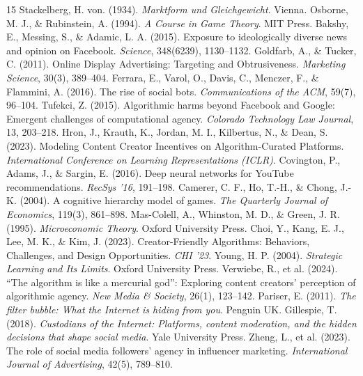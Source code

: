 \documentclass[12pt,letterpaper]{article}
\begin{document}
\begin{thebibliography}{15}
	 Stackelberg, H. von. (1934). \textit{Marktform und Gleichgewicht}. Vienna.
	 Osborne, M. J., \& Rubinstein, A. (1994). \textit{A Course in Game Theory}. MIT Press.
	 Bakshy, E., Messing, S., \& Adamic, L. A. (2015). Exposure to ideologically diverse news and opinion on Facebook. \textit{Science}, 348(6239), 1130--1132.
	 Goldfarb, A., \& Tucker, C. (2011). Online Display Advertising: Targeting and Obtrusiveness. \textit{Marketing Science}, 30(3), 389--404.
	 Ferrara, E., Varol, O., Davis, C., Menczer, F., \& Flammini, A. (2016). The rise of social bots. \textit{Communications of the ACM}, 59(7), 96--104.
	 Tufekci, Z. (2015). Algorithmic harms beyond Facebook and Google: Emergent challenges of computational agency. \textit{Colorado Technology Law Journal}, 13, 203--218.
	 Hron, J., Krauth, K., Jordan, M. I., Kilbertus, N., \& Dean, S. (2023). Modeling Content Creator Incentives on Algorithm-Curated Platforms. \textit{International Conference on Learning Representations (ICLR)}.
	 Covington, P., Adams, J., \& Sargin, E. (2016). Deep neural networks for YouTube recommendations. \textit{RecSys '16}, 191--198.
	 Camerer, C. F., Ho, T.-H., \& Chong, J.-K. (2004). A cognitive hierarchy model of games. \textit{The Quarterly Journal of Economics}, 119(3), 861--898.
	 Mas-Colell, A., Whinston, M. D., \& Green, J. R. (1995). \textit{Microeconomic Theory}. Oxford University Press.
	 Choi, Y., Kang, E. J., Lee, M. K., \& Kim, J. (2023). Creator-Friendly Algorithms: Behaviors, Challenges, and Design Opportunities. \textit{CHI '23}.
	 Young, H. P. (2004). \textit{Strategic Learning and Its Limits}. Oxford University Press.
	 Verwiebe, R., et al. (2024). “The algorithm is like a mercurial god”: Exploring content creators’ perception of algorithmic agency. \textit{New Media \& Society}, 26(1), 123--142.
	 Pariser, E. (2011). \textit{The filter bubble: What the Internet is hiding from you}. Penguin UK.
	 Gillespie, T. (2018). \textit{Custodians of the Internet: Platforms, content moderation, and the hidden decisions that shape social media}. Yale University Press.
	 Zheng, L., et al. (2023). The role of social media followers’ agency in influencer marketing. \textit{International Journal of Advertising}, 42(5), 789--810.
\end{thebibliography}
\end{document}
